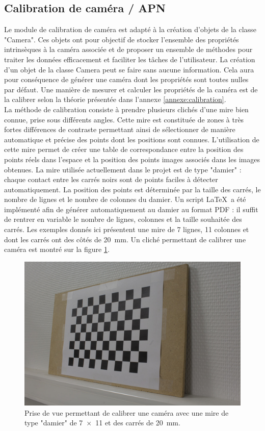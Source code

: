 \documentclass[a4paper, 11pt]{article}
\begin{document}
	\subsection{Calibration de caméra / APN}
		Le module de calibration de caméra est adapté à la création d'objets de la classe "Camera". Ces objets ont pour objectif de stocker l'ensemble des propriétés intrinsèques à la caméra associée et de proposer un ensemble de méthodes pour traiter les données efficacement et faciliter les tâches de l'utilisateur. La création d'un objet de la classe Camera peut se faire sans aucune information. Cela aura pour conséquence de générer une caméra dont les propriétés sont toutes nulles par défaut. Une manière de mesurer et calculer les propriétés de la caméra est de la calibrer selon la théorie présentée dans l'annexe \ref{annexe:calibration}.
		\\La méthode de calibration consiste à prendre plusieurs clichés d'une mire bien connue, prise sous différents angles. Cette mire est constituée de zones à très fortes différences de contraste permettant ainsi de sélectionner de manière automatique et précise des points dont les positions sont connues. L'utilisation de cette mire permet de créer une table de correspondance entre la position des points réels dans l'espace et la position des points images associés dans les images obtenues. La mire utilisée actuellement dans le projet est de type "damier" : chaque contact entre les carrés noirs sont de points faciles à détecter automatiquement. La position des points est déterminée par la taille des carrés, le nombre de lignes et le nombre de colonnes du damier. Un script \LaTeX\ a été implémenté afin de générer automatiquement au damier au format PDF : il suffit de rentrer en variable le nombre de lignes, colonnes et la taille souhaitée des carrés. Les exemples donnés ici présentent une mire de \num{7} lignes, \num{11} colonnes et dont les carrés ont des côtés de \SI{20}{\milli\meter}. Un cliché permettant de calibrer une caméra est montré sur la figure \ref{fig:mire}.
		\begin{figure}\centering
			\includegraphics[width=.5\linewidth]{IMG_8853_small.jpg}
			\caption{\label{fig:mire}Prise de vue permettant de calibrer une caméra avec une mire de type "damier" de \num{7x11} et des carrés de \SI{20}{\milli\meter}.}
		\end{figure}
\end{document}
